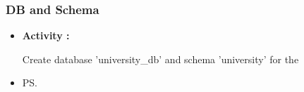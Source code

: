 \begin{frame}
	\frametitle{ DB and Schema}
	
	\begin{itemize}
	
	    \item<1->  \textbf{Activity :}
	    
	     Create database 'university\_db' and schema 'university' for the  
	
	    \item<2->   
	    {\ps
	    	
	    	
	    	     	
	    	
	    }
	
	\end{itemize}
	
\end{frame}